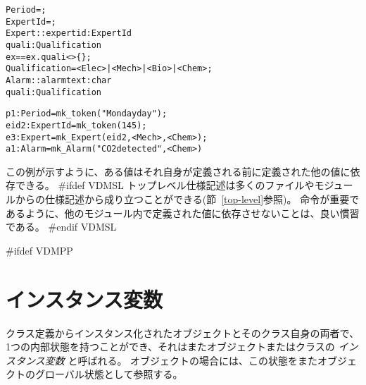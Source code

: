 \documentclass[\pformat,12pt]{jarticle}
\begin{document}
\begin{description}
\begin{alltt}
     Period = ;
     ExpertId = ;
     Expert :: expertid : ExpertId
               quali :  Qualification
      ex == ex.quali <> \{\};
     Qualification = <Elec> | <Mech> | <Bio> | <Chem>;
     Alarm :: alarmtext :  char
              quali : Qualification

 
     \PUBLIC p1: Period = mk_token("Monday day");
     \PRIVATE eid2 : ExpertId = mk_token(145);
     \PROTECTED e3 : Expert = mk_Expert(eid2, { <Mech>, <Chem> });
     \mbox{} a1 : Alarm = mk_Alarm("CO2 detected", <Chem>)
\end{alltt}
 この例が示すように、ある値はそれ自身が定義される前に定義された他の値に依存できる。
#ifdef VDMSL
  トップレベル仕様記述は多くのファイルやモジュールからの仕様記述から成り立つことができる(節~\ref{top-level}参照)。 
  命令が重要であるように、他のモジュール内で定義された値に依存させないことは、良い慣習である。
#endif VDMSL
\end{description}

#ifdef VDMPP
\section{インスタンス変数}
\label{sec:ivars}

クラス定義からインスタンス化されたオブジェクトとそのクラス自身の両者で、1つの内部状態を持つことができ、それはまたオブジェクトまたはクラスの \emph{インスタンス変数} と呼ばれる。 
オブジェクトの場合には、この状態をまたオブジェクトのグローバル状態として参照する。
\end{document}
